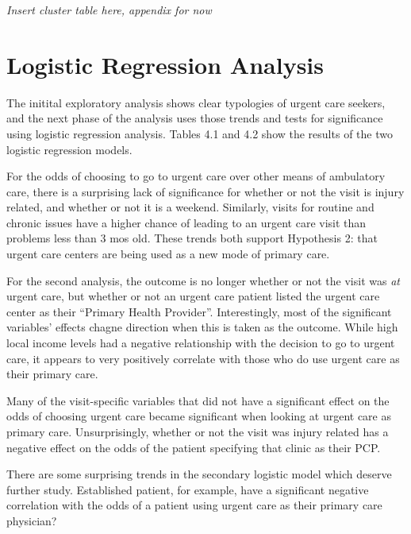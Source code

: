 \documentclass[12pt,twoside]{reedthesis}
\begin{document}
  \emph{Insert cluster table here, appendix for now}
  
  \section{Logistic Regression
  Analysis}\label{logistic-regression-analysis}
  
  The initital exploratory analysis shows clear typologies of urgent care
  seekers, and the next phase of the analysis uses those trends and tests
  for significance using logistic regression analysis. Tables 4.1 and 4.2
  show the results of the two logistic regression models.
  
  For the odds of choosing to go to urgent care over other means of
  ambulatory care, there is a surprising lack of significance for whether
  or not the visit is injury related, and whether or not it is a weekend.
  Similarly, visits for routine and chronic issues have a higher chance of
  leading to an urgent care visit than problems less than 3 mos old. These
  trends both support Hypothesis 2: that urgent care centers are being
  used as a new mode of primary care.
  
  For the second analysis, the outcome is no longer whether or not the
  visit was \emph{at} urgent care, but whether or not an urgent care
  patient listed the urgent care center as their ``Primary Health
  Provider''. Interestingly, most of the significant variables' effects
  chagne direction when this is taken as the outcome. While high local
  income levels had a negative relationship with the decision to go to
  urgent care, it appears to very positively correlate with those who do
  use urgent care as their primary care.
  
  Many of the visit-specific variables that did not have a significant
  effect on the odds of choosing urgent care became significant when
  looking at urgent care as primary care. Unsurprisingly, whether or not
  the visit was injury related has a negative effect on the odds of the
  patient specifying that clinic as their PCP.
  
  There are some surprising trends in the secondary logistic model which
  deserve further study. Established patient, for example, have a
  significant negative correlation with the odds of a patient using urgent
  care as their primary care physician?
  
\end{document}
